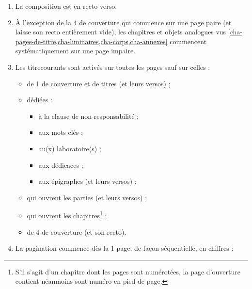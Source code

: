 \begin{enumerate}
\item La composition est en recto verso\exceptoneside.
\item À l'exception de la 4\ieme{} de
  couverture qui commence sur
  une page paire (et laisse
  son recto entièrement vide), les chapitres et objets analogues vus
  \vref{cha-pages-de-titre,cha-liminaires,cha-corps,cha-annexes} commencent
  systématiquement sur une page impaire\exceptoneside.
\item Les \glspl{titrecourant} sont activés sur toutes les pages sauf sur
  celles :
  \begin{itemize}
  \item de 1\iere{} de couverture
    et de titres (et leurs versos) ;
  \item dédiées :
    \begin{itemize}
    \item à la clause de non-responsabilité ;
    \item aux mots clés ;
    \item au(x) laboratoire(s) ;
    \item aux dédicaces ;
    \item aux épigraphes (et leurs versos) ;
    \end{itemize}
  \item qui ouvrent les parties (et leurs versos) ;
  \item qui ouvrent les chapitres\footnote{%
      S'il s'agit d'un chapitre dont les pages sont numérotées, la page
      d'ouverture contient néanmoins sont numéro en pied de page.%
    } ;
  \item de 4\ieme{} de couverture (et son recto).
  \end{itemize}
\item La \gls{pagination} commence dès la 1\iere{} page, de façon
  séquentielle, en chiffres :

\end{enumerate}
